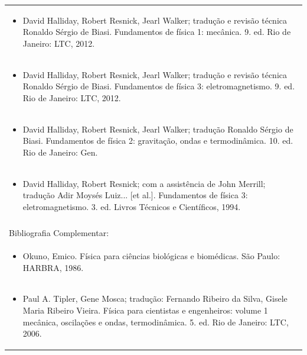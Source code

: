 \documentclass[11pt]{article}
\begin{document}
\begin{center}
\begin{longtable}{|p{4cm}|p{4cm}|p{4cm}|p{4cm}|}
\multicolumn{4}{|p{\dimexpr 16cm + 6\tabcolsep\relax}|}{\begin{itemize}\item David Halliday, Robert Resnick, Jearl Walker; tradução e revisão técnica Ronaldo Sérgio de Biasi. Fundamentos de física 1: mecânica. 9. ed. Rio de Janeiro: LTC, 2012.\end{itemize}}\\
\multicolumn{4}{|p{\dimexpr 16cm + 6\tabcolsep\relax}|}{\begin{itemize}\item David Halliday, Robert Resnick, Jearl Walker; tradução e revisão técnica Ronaldo Sérgio de Biasi. Fundamentos de física 3: eletromagnetismo. 9. ed. Rio de Janeiro: LTC, 2012.\end{itemize}}\\
\multicolumn{4}{|p{\dimexpr 16cm + 6\tabcolsep\relax}|}{\begin{itemize}\item David Halliday, Robert Resnick, Jearl Walker; tradução Ronaldo Sérgio de Biasi. Fundamentos de física 2: gravitação, ondas e termodinâmica. 10. ed. Rio de Janeiro: Gen.\end{itemize}}\\
\multicolumn{4}{|p{\dimexpr 16cm + 6\tabcolsep\relax}|}{\begin{itemize}\item David Halliday, Robert Resnick; com a assistência de John Merrill; tradução Adir Moysés Luiz... [et al.]. Fundamentos de física 3: eletromagnetismo. 3. ed. Livros Técnicos e Científicos, 1994.\end{itemize}}\\
\multicolumn{4}{|p{16cm}|}{}\\
\hline
\multicolumn{4}{|p{16cm}|}{Bibliografia Complementar:}\\*
\multicolumn{4}{|p{\dimexpr 16cm + 6\tabcolsep\relax}|}{\begin{itemize}\item Okuno, Emico. Física para ciências biológicas e biomédicas. São Paulo: HARBRA, 1986.\end{itemize}}\\
\multicolumn{4}{|p{\dimexpr 16cm + 6\tabcolsep\relax}|}{\begin{itemize}\item Paul A. Tipler, Gene Mosca; tradução: Fernando Ribeiro da Silva, Gisele Maria Ribeiro Vieira. Física para cientistas e engenheiros: volume 1 mecânica, oscilações e ondas, termodinâmica. 5. ed. Rio de Janeiro: LTC, 2006.\end{itemize}}\\
\hline
\end{longtable}
\end{center}
\end{document}
